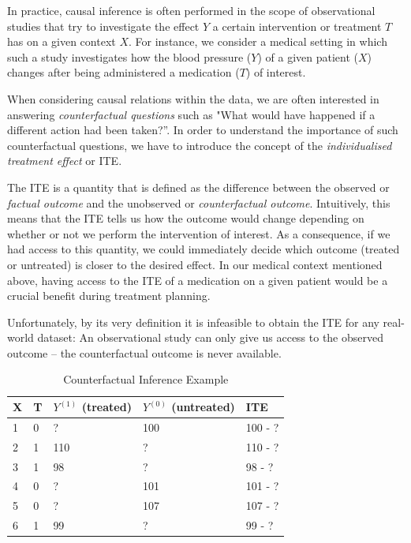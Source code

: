 In practice, causal inference is often performed in the scope of observational studies that try to investigate the effect $Y$ a certain intervention or treatment $T$ has on a given context $X$. For instance, we consider a medical setting in which such a study investigates how the blood pressure ($Y$) of a given patient ($X$) changes after being administered a medication ($T$) of interest.

When considering causal relations within the data, we are often interested in answering \emph{counterfactual questions} such as "What would have happened if a different action had been taken?”. In order to understand the importance of such counterfactual questions, we have to introduce the concept of the \emph{individualised treatment effect} or ITE.

The ITE is a quantity that is defined as the difference between the observed or \emph{factual outcome} and the unobserved or \emph{counterfactual outcome}. Intuitively, this means that the ITE tells us how the outcome would change depending on whether or not we perform %
the intervention of interest. 
As a consequence, if we had access to this quantity, we could immediately decide which outcome (treated or untreated) is closer to the desired effect. In our medical context mentioned above, having access to the ITE of a medication on a given patient would be a crucial benefit during treatment planning. 

Unfortunately, by its very definition it is infeasible to obtain the ITE for any real-world dataset: An observational study can only give us access to the observed outcome -- the counterfactual outcome is never available. 
\begin{table}[]
	\centering
	\caption{Counterfactual Inference Example}
	\label{tab:counterfactual-inference-motiviation}
	\begin{tabular}{@{}lllll@{}}
		\toprule
		X & T & $Y^{(1)}$ (treated) & $Y^{(0)}$ (untreated) & ITE \\ \midrule
		1 & 0 & ? & 100 & 100 - ? \\
		2 & 1 & 110 & ? & 110 - ?  \\
		3 & 1 & 98 & ? &  98 - ?  \\
		4 & 0 & ? & 101 & 101 - ? \\
		5 & 0 & ? & 107 &  107 - ? \\
		6 & 1 & 99 & ? &  99 - ?\\ \bottomrule
	\end{tabular}
\end{table}

